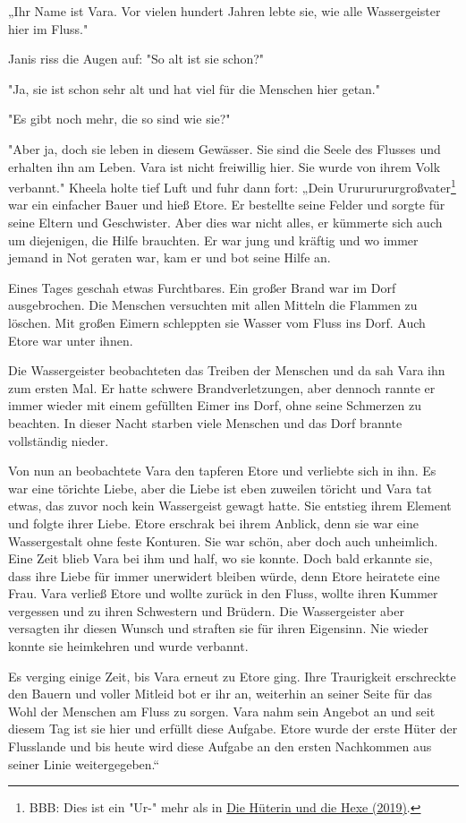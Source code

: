 \documentclass[10pt, a4paper, oneside]{book}
\newcommand{\refstorytext}[1]{\hyperref[Storytext: #1]{#1}}
\begin{document}
\begin{multicols}{2}
„Ihr Name ist Vara. Vor vielen hundert Jahren lebte sie, wie alle Wassergeister hier im Fluss."

Janis riss die Augen auf: "So alt ist sie schon?"

"Ja, sie ist schon sehr alt und hat viel für die Menschen hier getan."

"Es gibt noch mehr, die so sind wie sie?"

"Aber ja, doch sie leben in diesem Gewässer. Sie sind die Seele des Flusses und erhalten ihn am Leben. Vara ist nicht freiwillig hier. Sie wurde von ihrem Volk verbannt." Kheela holte tief Luft und fuhr dann fort: „Dein Urururururgroßvater\footnote{BBB: Dies ist ein "Ur-" mehr als in \refstorytext{Die Hüterin und die Hexe (2019)}.} war ein einfacher Bauer und hieß Etore. Er bestellte seine Felder und sorgte für seine Eltern und Geschwister. Aber dies war nicht alles, er kümmerte sich auch um diejenigen, die Hilfe brauchten. Er war jung und kräftig und wo immer jemand in Not geraten war, kam er und bot seine Hilfe an.

Eines Tages geschah etwas Furchtbares. Ein großer Brand war im Dorf ausgebrochen. Die Menschen versuchten mit allen Mitteln die Flammen zu löschen. Mit großen Eimern schleppten sie Wasser vom Fluss ins Dorf. Auch Etore war unter ihnen.\bigskip

Die Wassergeister beobachteten das Treiben der Menschen und da sah Vara ihn zum ersten Mal. Er hatte schwere Brandverletzungen, aber dennoch rannte er immer wieder mit einem gefüllten Eimer ins Dorf, ohne seine Schmerzen zu beachten. In dieser Nacht starben viele Menschen und das Dorf brannte vollständig nieder.

Von nun an beobachtete Vara den tapferen Etore und verliebte sich in ihn. Es war eine törichte Liebe, aber die Liebe ist eben zuweilen töricht und Vara tat etwas, das zuvor noch kein Wassergeist gewagt hatte. Sie entstieg ihrem Element und folgte ihrer Liebe. Etore erschrak bei ihrem Anblick, denn sie war eine Wassergestalt ohne feste Konturen. Sie war schön, aber doch auch unheimlich. Eine Zeit blieb Vara bei ihm und half, wo sie konnte. Doch bald erkannte sie, dass ihre Liebe für immer unerwidert bleiben würde, denn Etore heiratete eine Frau. Vara verließ Etore und wollte zurück in den Fluss, wollte ihren Kummer vergessen und zu ihren Schwestern und Brüdern. Die Wassergeister aber versagten ihr diesen Wunsch und straften sie für ihren Eigensinn. Nie wieder konnte sie heimkehren und wurde verbannt.\bigskip

Es verging einige Zeit, bis Vara erneut zu Etore ging. Ihre Traurigkeit erschreckte den Bauern und voller Mitleid bot er ihr an, weiterhin an seiner Seite für das Wohl der Menschen am Fluss zu sorgen. Vara nahm sein Angebot an und seit diesem Tag ist sie hier und erfüllt diese Aufgabe. Etore wurde der erste Hüter der Flusslande und bis heute wird diese Aufgabe an den ersten Nachkommen aus seiner Linie weitergegeben.“


\end{multicols}
\end{document}
